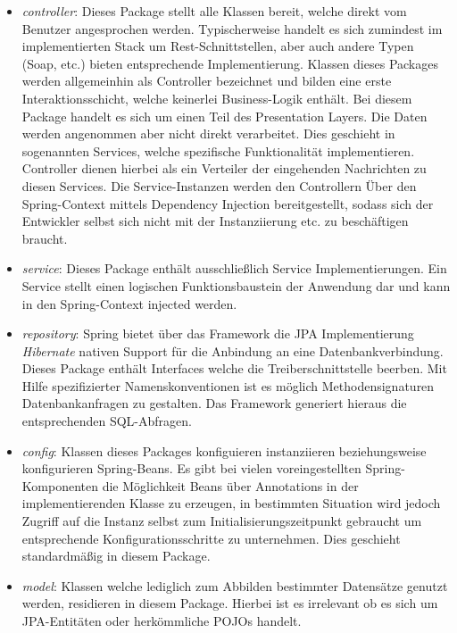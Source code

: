 \begin{itemize}
  \item \emph{controller}: Dieses Package stellt alle Klassen bereit, welche direkt vom Benutzer angesprochen werden. Typischerweise handelt es sich zumindest im implementierten Stack um Rest-Schnittstellen, aber auch andere Typen (Soap, etc.) bieten entsprechende Implementierung. Klassen dieses Packages werden allgemeinhin als Controller bezeichnet und bilden eine erste Interaktionsschicht, welche keinerlei Business-Logik enthält. Bei diesem Package handelt es sich um einen Teil des Presentation Layers. Die Daten werden angenommen aber nicht direkt verarbeitet. Dies geschieht in sogenannten Services, welche spezifische Funktionalität implementieren. Controller dienen hierbei als ein Verteiler der eingehenden Nachrichten zu diesen Services. Die Service-Instanzen werden den Controllern Über den Spring-Context mittels Dependency Injection bereitgestellt, sodass sich der Entwickler selbst sich nicht mit der Instanziierung etc. zu beschäftigen braucht. 

  \item \emph{service}: Dieses Package enthält ausschließlich Service Implementierungen. Ein Service stellt einen logischen Funktionsbaustein der Anwendung dar und kann in den Spring-Context injected werden. 

  \item \emph{repository}: Spring bietet über das Framework die JPA Implementierung \emph{Hibernate} nativen Support für die Anbindung an eine Datenbankverbindung. Dieses Package enthält Interfaces welche die Treiberschnittstelle beerben. Mit Hilfe spezifizierter Namenskonventionen ist es möglich Methodensignaturen Datenbankanfragen zu gestalten. Das Framework generiert hieraus die entsprechenden SQL-Abfragen.

  \item \emph{config}: Klassen dieses Packages konfiguieren instanziieren beziehungsweise konfigurieren Spring-Beans. Es gibt bei vielen voreingestellten Spring-Komponenten die Möglichkeit Beans über Annotations in der implementierenden Klasse zu erzeugen, in bestimmten Situation wird jedoch Zugriff auf die Instanz selbst zum Initialisierungszeitpunkt gebraucht um entsprechende Konfigurationsschritte zu unternehmen. Dies geschieht standardmäßig in diesem Package.

  \item \emph{model}: Klassen welche lediglich zum Abbilden bestimmter Datensätze genutzt werden, residieren in diesem Package. Hierbei ist es irrelevant ob es sich um JPA-Entitäten oder herkömmliche POJOs handelt.


\end{itemize}
